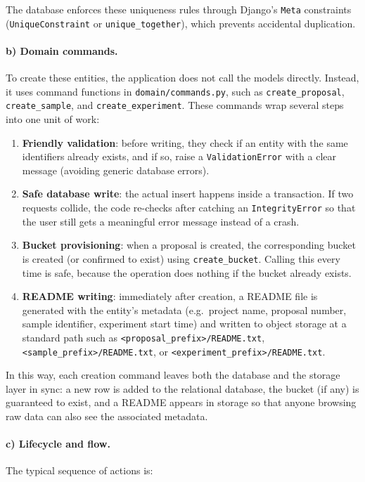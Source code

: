 The database enforces these uniqueness rules through Django’s \texttt{Meta} constraints (\texttt{UniqueConstraint} or 
\texttt{unique\_together}), which prevents accidental duplication.  

\paragraph{b) Domain commands.}
To create these entities, the application does not call the models directly.  
Instead, it uses command functions in \texttt{domain/commands.py}, such as \texttt{create\_proposal}, 
\texttt{create\_sample}, and \texttt{create\_experiment}.  
These commands wrap several steps into one unit of work:

\begin{enumerate}
	\item \textbf{Friendly validation}: before writing, they check if an entity with the same identifiers already exists, 
	and if so, raise a \texttt{ValidationError} with a clear message (avoiding generic database errors).
	\item \textbf{Safe database write}: the actual insert happens inside a transaction. 
	If two requests collide, the code re-checks after catching an \texttt{IntegrityError} 
	so that the user still gets a meaningful error message instead of a crash.
	\item \textbf{Bucket provisioning}: when a proposal is created, the corresponding bucket is created (or confirmed to exist) 
	using \texttt{create\_bucket}. Calling this every time is safe, because the operation does nothing if the bucket already exists.
	\item \textbf{README writing}: immediately after creation, a README file is generated with the entity’s metadata 
	(e.g.\ project name, proposal number, sample identifier, experiment start time) and written to object storage at a standard path 
	such as \texttt{<proposal\_prefix>/README.txt}, \texttt{<sample\_prefix>/README.txt}, or \texttt{<experiment\_prefix>/README.txt}.
\end{enumerate}

In this way, each creation command leaves both the database and the storage layer in sync:  
a new row is added to the relational database, the bucket (if any) is guaranteed to exist, and a README appears in storage 
so that anyone browsing raw data can also see the associated metadata.


\paragraph{c) Lifecycle and flow.}
The typical sequence of actions is:

